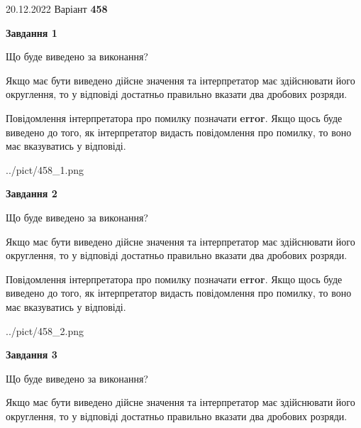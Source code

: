 \documentclass[12pt, ukrainian]{article}
\begin{document}
{20.12.2022 Варіант \No \textbf { 458 }\par}
{
\begin {Large}

{\begin {center}\textbf{Завдання 1}\end {center}}\par
Що буде виведено за виконання? \par

Якщо має бути виведено дійсне значення та інтерпретатор має здійснювати його округлення, 
то у відповіді достатньо правильно вказати два дробових розряди.

Повідомлення інтерпретатора про помилку позначати \textbf{error}.
Якщо щось буде виведено до того, як інтерпретатор видасть повідомлення про помилку, 
то воно має вказуватись у відповіді. \par

\begin{center}
	{../pict/458_1.png}
\end{center}
\newpage

{\begin {center}\textbf{Завдання 2}\end {center}}\par
Що буде виведено за виконання? \par

Якщо має бути виведено дійсне значення та інтерпретатор має здійснювати його округлення, 
то у відповіді достатньо правильно вказати два дробових розряди.

Повідомлення інтерпретатора про помилку позначати \textbf{error}.
Якщо щось буде виведено до того, як інтерпретатор видасть повідомлення про помилку, 
то воно має вказуватись у відповіді. \par

\begin{center}
	{../pict/458_2.png}
\end{center}
\newpage

{\begin {center}\textbf{Завдання 3}\end {center}}\par
Що буде виведено за виконання? \par

Якщо має бути виведено дійсне значення та інтерпретатор має здійснювати його округлення, 
то у відповіді достатньо правильно вказати два дробових розряди.


\end{Large}}
\end{document}
